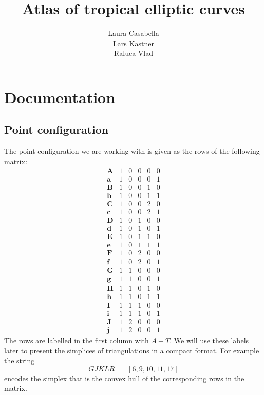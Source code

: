 \documentclass[a4paper, DIV=17, twocolumn]{scrartcl}
\title{Atlas of tropical elliptic curves}
\author{Laura Casabella\\Lars Kastner\\Raluca Vlad}
\begin{document}
\maketitle
\tableofcontents
\section{Documentation}
\subsection{Point configuration}
The point configuration we are working with is given as the rows of the following matrix:
\[
   \begin{array}{c|ccccc}
      \textbf{A} & 1 & 0 & 0 & 0 & 0\\
      \textbf{a} & 1 & 0 & 0 & 0 & 1\\
      \textbf{B} & 1 & 0 & 0 & 1 & 0\\
      \textbf{b} & 1 & 0 & 0 & 1 & 1\\
      \textbf{C} & 1 & 0 & 0 & 2 & 0\\
      \textbf{c} & 1 & 0 & 0 & 2 & 1\\
      \textbf{D} & 1 & 0 & 1 & 0 & 0\\
      \textbf{d} & 1 & 0 & 1 & 0 & 1\\
      \textbf{E} & 1 & 0 & 1 & 1 & 0\\
      \textbf{e} & 1 & 0 & 1 & 1 & 1\\
      \textbf{F} & 1 & 0 & 2 & 0 & 0\\
      \textbf{f} & 1 & 0 & 2 & 0 & 1\\
      \textbf{G} & 1 & 1 & 0 & 0 & 0\\
      \textbf{g} & 1 & 1 & 0 & 0 & 1\\
      \textbf{H} & 1 & 1 & 0 & 1 & 0\\
      \textbf{h} & 1 & 1 & 0 & 1 & 1\\
      \textbf{I} & 1 & 1 & 1 & 0 & 0\\
      \textbf{i} & 1 & 1 & 1 & 0 & 1\\
      \textbf{J} & 1 & 2 & 0 & 0 & 0\\
      \textbf{j} & 1 & 2 & 0 & 0 & 1
   \end{array}
\]
The rows are labelled in the first column with $A-T$. We will use these
labels later to present the simplices of triangulations in a compact format. For
example the string
\[
GJKLR\ =\ [6,9,10,11,17]
\]
encodes the simplex that is the convex hull of the corresponding rows in the
matrix.
\end{document}
